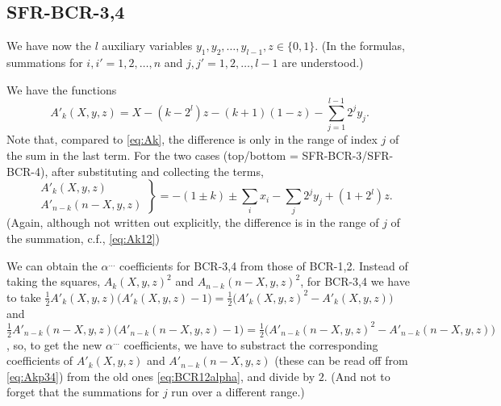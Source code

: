 \documentclass[a4paper,11pt]{article}
\begin{document}
\subsection{SFR-BCR-3,4}
We have now the $l$ auxiliary variables $y_1,y_2,\dots,y_{l-1},z\in\{0,1\}$.
(In the formulas, summations for $i,i' = 1,2,\dots,n$ and $j,j' = 1,2,\dots,l-1$ are understood.)

We have the functions
\begin{equation}
\label{eq:Akp}
A'_k(X,y,z) = X - (k-2^l)z - (k+1)(1-z) - \sum_{j=1}^{l-1}2^jy_j.
\end{equation}
Note that, compared to \eqref{eq:Ak},
 the difference is only in the range of index $j$ of the sum in the last term.
For the  two cases
(top/bottom = SFR-BCR-3/SFR-BCR-4),
after substituting and collecting the terms,
\begin{equation}
\label{eq:Akp34}
\left.\begin{aligned}
&A'_k(X,y,z) \\
&A'_{n-k}({n-X},y,z) 
\end{aligned}\right\}
= -(1\pm k) \pm \sum_i x_i - \sum_j 2^jy_j + (1+2^l)z.
\end{equation}
(Again, although not written out explicitly, 
the difference is in the range of $j$ of the summation, c.f., \eqref{eq:Ak12})

We can obtain the $\alpha^{\dots}$ coefficients for BCR-3,4
from those of BCR-1,2.
Instead of taking the squares, $A_k(X,y,z)^2$ and $A_{n-k}(n-X,y,z)^2$,
for BCR-3,4 we have to take 
$\frac12 A'_k(X,y,z)\bigl(A'_k(X,y,z)-1\bigr)=\frac12\bigl(A'_k(X,y,z)^2-A'_k(X,y,z)\bigr)$ and
$\frac12 A'_{n-k}(n-X,y,z)\bigl(A'_{n-k}(n-X,y,z)-1\bigr)=\frac12\bigl(A'_{n-k}(n-X,y,z)^2-A'_{n-k}(n-X,y,z)\bigr)$,
so, to get the new $\alpha^{\dots}$ coefficients,
we have to substract the corresponding coefficients of $A'_k(X,y,z)$ and $A'_{n-k}(n-X,y,z)$
(these can be read off from \eqref{eq:Akp34})
from the old ones \eqref{eq:BCR12alpha}, and divide by $2$.
(And not to forget that the summations for $j$ run over a different range.)
\end{document}
